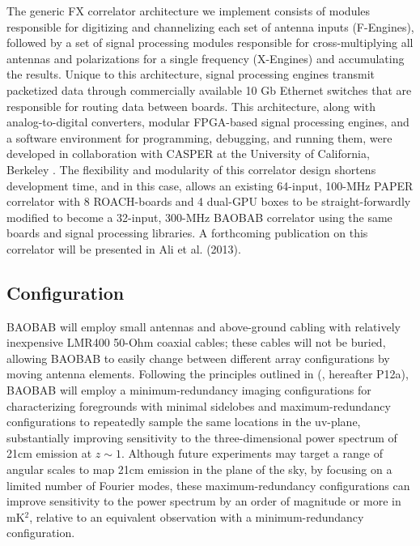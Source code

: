 \documentclass[10pt,iop]{emulateapj}
\begin{document}
The generic FX correlator architecture we implement consists of
modules responsible for digitizing and
channelizing each set of antenna inputs (F-Engines), followed by a set
of signal processing modules responsible for cross-multiplying all
antennas and polarizations for a single frequency (X-Engines) and
accumulating the results. 
Unique to this architecture, 
signal processing engines transmit packetized data through
commercially available 10 Gb Ethernet switches
that are responsible for routing data between boards.  This
architecture, along with analog-to-digital converters, modular
FPGA-based signal processing engines, and a software environment for
programming, debugging, and running them, were developed in
collaboration with CASPER at the University of California, Berkeley \citep{parsons_et_al_2008}.  
The flexibility and modularity of this correlator design
shortens development time, and in this case, allows an existing 64-input, 100-MHz
PAPER correlator with 8 ROACH-boards and 4 dual-GPU boxes
to be straight-forwardly modified to become a 32-input, 300-MHz BAOBAB correlator
using the same boards and signal processing libraries.  A forthcoming publication
on this correlator will be presented in Ali et al. (2013).
 
\subsection{Configuration}
 
BAOBAB will employ small antennas and above-ground cabling with relatively inexpensive 
LMR400 50-Ohm coaxial cables; these cables will not be buried, allowing BAOBAB
to easily change between different array configurations by moving antenna elements.
Following the principles outlined in
(\citealt{parsons_et_al_2012a}, hereafter P12a), BAOBAB will employ a minimum-redundancy imaging 
configurations for characterizing foregrounds with minimal sidelobes
and maximum-redundancy configurations to repeatedly
sample the same locations in the uv-plane, substantially improving sensitivity
to the three-dimensional power spectrum of 21cm emission at $z\sim1$.
Although future experiments may target a range of angular scales to map 21cm emission
in the plane of the sky, by focusing on a limited number of Fourier modes, these
maximum-redundancy configurations can improve sensitivity to the
power spectrum by an order of magnitude or more in mK$^2$, relative to an
equivalent observation with a minimum-redundancy configuration.
\end{document}

